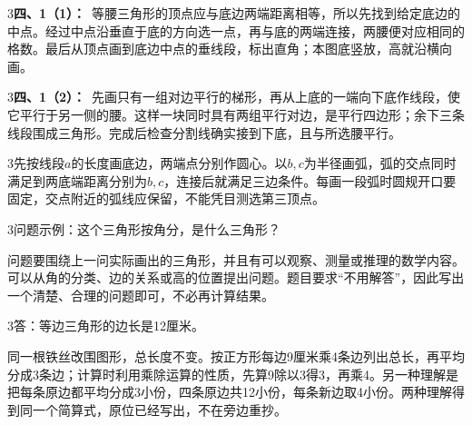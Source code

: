 \documentclass[multi=snippet,border={5bp 20bp 5bp 5bp}]{standalone}
\newenvironment{snippet}[3]{\begin{minipage}{#1bp}\color{answerred}\fontsize{#2}{#3}\selectfont\raggedright}{\end{minipage}}
\begin{document}
\begin{snippet}{505}{11.5}{14}\begin{multicols}{3}\raggedcolumns \textbf{四、1（1）：}\ 等腰三角形的顶点应与底边两端距离相等，所以先找到给定底边的中点。经过中点沿垂直于底的方向选一点，再与底的两端连接，两腰便对应相同的格数。最后从顶点画到底边中点的垂线段，标出直角；本图底竖放，高就沿横向画。\end{multicols}\end{snippet}
\begin{snippet}{505}{11.5}{14}\begin{multicols}{3}\raggedcolumns \textbf{四、1（2）：}\ 先画只有一组对边平行的梯形，再从上底的一端向下底作线段，使它平行于另一侧的腰。这样一块同时具有两组平行对边，是平行四边形；余下三条线段围成三角形。完成后检查分割线确实接到下底，且与所选腰平行。\end{multicols}\end{snippet}
\begin{snippet}{505}{11.5}{14}\begin{multicols}{3}\raggedcolumns 先按线段\(a\)\allowbreak 的长度画底边，两端点分别作圆心。以\(b,\allowbreak c\)\allowbreak 为半径画弧，弧的交点同时满足到两底端距离分别为\(b,\allowbreak c\)\allowbreak ，连接后就满足三边条件。每画一段弧时圆规开口要固定，交点附近的弧线应保留，不能凭目测选第三顶点。\end{multicols}\end{snippet}
\begin{snippet}{505}{11.5}{14}\begin{multicols}{3}\raggedcolumns 问题示例：这个三角形按角分，是什么三角形？\par 问题要围绕上一问实际画出的三角形，并且有可以观察、测量或推理的数学内容。可以从角的分类、边的关系或高的位置提出问题。题目要求“不用解答”，因此写出一个清楚、合理的问题即可，不必再计算结果。\end{multicols}\end{snippet}
\begin{snippet}{505}{11.5}{14}\begin{multicols}{3}\raggedcolumns 答：等边三角形的边长是12厘米。\par 同一根铁丝改围图形，总长度不变。按正方形每边9厘米乘4条边列出总长，再平均分成3条边；计算时利用乘除运算的性质，先算9除以3得3，再乘4。另一种理解是把每条原边都平均分成3小份，四条原边共12小份，每条新边取4小份。两种理解得到同一个简算式，原位已经写出，不在旁边重抄。\end{multicols}\end{snippet}
\end{document}
